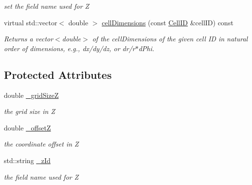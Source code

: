 \begin{DoxyCompactItemize}
\begin{DoxyCompactList}\small\item\em set the field name used for Z \item\end{DoxyCompactList}\item 
virtual std::vector$<$ double $>$ \hyperlink{class_d_d4hep_1_1_d_d_segmentation_1_1_cartesian_grid_x_y_z_a6a1df52f930ef7fea680bfd532d0b6cb}{cellDimensions} (const \hyperlink{namespace_d_d4hep_1_1_d_d_segmentation_ac7af071d85cb48820914434a07e21ba1}{CellID} \&cellID) const 
\begin{DoxyCompactList}\small\item\em Returns a vector$<$double$>$ of the cellDimensions of the given cell ID in natural order of dimensions, e.g., dx/dy/dz, or dr/r$\ast$dPhi. \item\end{DoxyCompactList}\end{DoxyCompactItemize}
\subsection*{Protected Attributes}
\begin{DoxyCompactItemize}
\item 
double \hyperlink{class_d_d4hep_1_1_d_d_segmentation_1_1_cartesian_grid_x_y_z_a9e67a94e0fb2dfa8d3343c95d9c04ad0}{\_\-gridSizeZ}
\begin{DoxyCompactList}\small\item\em the grid size in Z \item\end{DoxyCompactList}\item 
double \hyperlink{class_d_d4hep_1_1_d_d_segmentation_1_1_cartesian_grid_x_y_z_a1578ef683b88f0d4897c354885a488b8}{\_\-offsetZ}
\begin{DoxyCompactList}\small\item\em the coordinate offset in Z \item\end{DoxyCompactList}\item 
std::string \hyperlink{class_d_d4hep_1_1_d_d_segmentation_1_1_cartesian_grid_x_y_z_ab6ef126016dd03434b814590c0ca64f9}{\_\-zId}
\begin{DoxyCompactList}\small\item\em the field name used for Z \item\end{DoxyCompactList}\end{DoxyCompactItemize}


